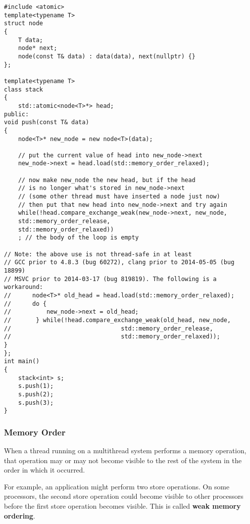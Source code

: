 \documentclass[12pt,a4paper]{report}
\begin{document}
\begin{lstlisting}
#include <atomic>
template<typename T>
struct node
{
	T data;
	node* next;
	node(const T& data) : data(data), next(nullptr) {}
};

template<typename T>
class stack
{
	std::atomic<node<T>*> head;
public:
void push(const T& data)
{
	node<T>* new_node = new node<T>(data);

	// put the current value of head into new_node->next
	new_node->next = head.load(std::memory_order_relaxed);

	// now make new_node the new head, but if the head
	// is no longer what's stored in new_node->next
	// (some other thread must have inserted a node just now)
	// then put that new head into new_node->next and try again
	while(!head.compare_exchange_weak(new_node->next, new_node,
	std::memory_order_release,
	std::memory_order_relaxed))
	; // the body of the loop is empty

// Note: the above use is not thread-safe in at least 
// GCC prior to 4.8.3 (bug 60272), clang prior to 2014-05-05 (bug 18899)
// MSVC prior to 2014-03-17 (bug 819819). The following is a workaround:
//      node<T>* old_head = head.load(std::memory_order_relaxed);
//      do {
//          new_node->next = old_head;
//       } while(!head.compare_exchange_weak(old_head, new_node,
//                               std::memory_order_release,
//                               std::memory_order_relaxed));
}
};
int main()
{
	stack<int> s;
	s.push(1);
	s.push(2);
	s.push(3);
}
\end{lstlisting}
\subsubsection*{Memory Order}
When a thread running on a multithread system performs a memory operation, that operation may or may not become visible to the rest of the system in the order in which it occurred.
\par
For example, an application might perform two store operations. On some processors, the second store operation could become visible to other processors before the first store operation becomes visible. This is called \textbf{weak memory ordering}.
\end{document}
